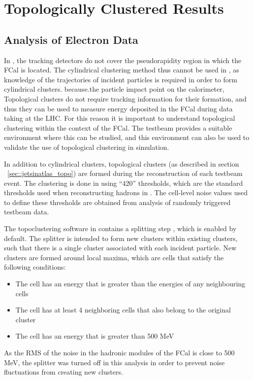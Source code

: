 %
%
%
%
%
%
%
\clearpage
\section{Topologically Clustered Results}
\subsection{Analysis of Electron Data}

In \atlas, the tracking detectors do not cover the pseudorapidity region in which the FCal is located. The cylindrical clustering method thus cannot be used in \atlas, as knowledge of the trajectories of incident particles is required in order to form cylindrical clusters. because.the particle impact point on the calorimeter,   Topological clusters do not require tracking information for their formation, and thus they can be used to measure energy deposited in the FCal during data taking at the LHC. For this reason it is important to understand topological clustering within the context of the FCal. The testbeam provides a suitable environment where this can be studied, and this environment can also be used to validate the use of topological clustering in simulation.   

 In addition to cylindrical clusters, topological clusters (as described in section ~\ref{sec::jetsinatlas_topo}) are formed during the reconstruction of each testbeam event. The clustering is done in \athena using ``420'' thresholds, which are the standard thresholds used when reconstructing hadrons in \atlas. The cell-level noise values used to define these thresholds are obtained from analysis of randomly triggered testbeam data. 

The topoclustering software in \athena contains a splitting step \cite{Lampl:1099735}, which is enabled by default. The splitter is intended to form new clusters within existing clusters, such that there is a single cluster associated with each incident particle. New clusters are formed around local maxima, which are cells that satisfy the following conditions:
\begin{itemize}
\item The cell has an energy that is greater than the energies of any neighbouring cells
\item The cell has at least 4 neighboring cells that also belong to the original cluster
\item The cell has an energy that is greater than 500 MeV
\end{itemize}
As the RMS of the noise in the hadronic modules of the FCal is close to 500 MeV, the splitter was turned off in this analysis in order to prevent noise fluctuations from creating new clusters.

